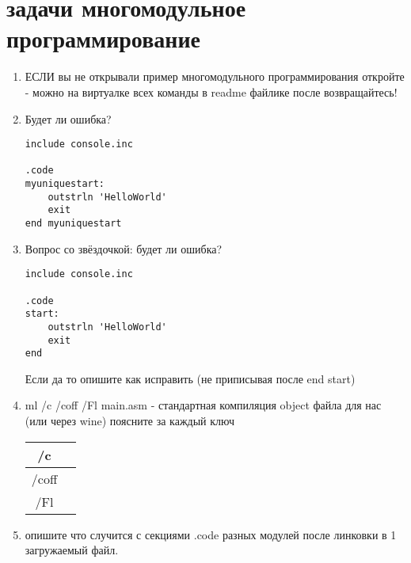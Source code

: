 \documentclass[a4paper,10pt]{article}
\begin{document}
\section*{задачи многомодульное программирование}
\begin{enumerate}
    
    \item ЕСЛИ вы не открывали пример многомодульного программирования откройте - можно на виртуалке всех команды в readme файлике после возвращайтесь!
    \item Будет ли ошибка?
\begin{verbatim}
include console.inc

.code
myuniquestart: 
    outstrln 'HelloWorld'
    exit
end myuniquestart
\end{verbatim}
    \item Вопрос со звёздочкой: будет ли ошибка?
\begin{verbatim}
include console.inc

.code
start: 
    outstrln 'HelloWorld'
    exit
end
\end{verbatim}
    Если да то опишите как исправить (не приписывая после end start)
    \item ml /c /coff /Fl main.asm - стандартная компиляция object файла для нас (или через wine) поясните за каждый ключ \\
    \begin{tabular*}{15cm}{c|c}
        \hline
        /c &   \\
        \hline
        /coff & \\
        \hline
        /Fl & \\
        \hline
    \end{tabular*}
    \item опишите что случится с секциями .code разных модулей после линковки в 1 загружаемый файл.
\end{enumerate}
    
    
\end{document}
